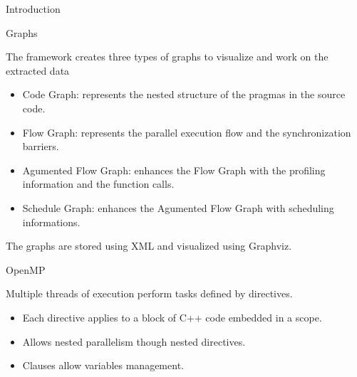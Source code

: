 \documentclass[xcolor=dvipsnames]{beamer}
\begin{document}
\begin{section}{Introduction}
\begin{frame}{\hskip 0.3cm }
\end{frame}









\begin{frame}{\hskip 0.3cm Graphs}


The framework creates three types of graphs to visualize and work on the extracted data 


\begin{itemize}		

\item Code Graph: represents the nested structure of the pragmas in the source code.

\item Flow Graph: represents the parallel execution flow and the synchronization barriers.

\item Agumented Flow Graph: enhances the Flow Graph with the profiling information and the function calls.

\item Schedule Graph: enhances the Agumented Flow Graph with scheduling informations.


\end{itemize}			

The graphs are stored using XML and visualized using Graphviz.



\end{frame}








\begin{frame}{\hskip 0.3cm OpenMP }

Multiple threads of execution perform tasks defined by directives.

\begin{itemize}
\item Each directive applies to  a block of C++ code embedded in a scope.

\item Allows nested parallelism though nested directives.

\item Clauses allow variables management.
\end{itemize}

\begin{block}


\end{block}
\end{frame}
\end{section}
\end{document}
